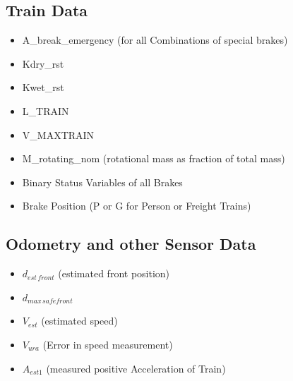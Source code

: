 \documentclass{template/openetcs_article}
\begin{document}
\subsection{Train Data}
\begin{itemize}
\item A\_break\_emergency (for all Combinations of special brakes)
\item Kdry\_rst
\item Kwet\_rst
\item L\_TRAIN
\item V\_MAXTRAIN
\item M\_rotating\_nom (rotational mass as fraction of total mass)
\item Binary Status Variables of all Brakes
\item Brake Position (P or G for Person or Freight Trains)
\end{itemize}


\subsection{Odometry and other Sensor Data}
\begin{itemize}
\item $d_{est\,front}$ (estimated front position)
\item $d_{max\,safefront}$
\item $V_{est}$ (estimated speed)
\item $V_{ura}$ (Error in speed measurement)
\item $A_{est1}$ (measured positive Acceleration of Train)


\end{itemize}




%



\end{document}
